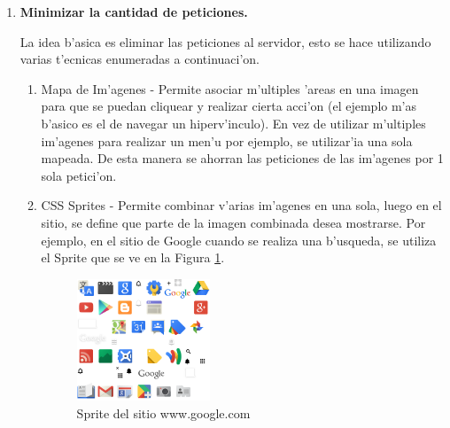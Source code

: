 \begin{enumerate}

\item \textbf{Minimizar la cantidad de peticiones.}

La idea b'asica es eliminar las peticiones al servidor, esto se hace utilizando varias t'ecnicas enumeradas a continuaci'on.

	\begin{enumerate}
	\item Mapa de Im'agenes - Permite asociar m'ultiples 'areas en una imagen para que se puedan cliquear y realizar cierta acci'on (el ejemplo m'as b'asico es el de navegar un hiperv'inculo). En vez de utilizar m'ultiples im'agenes para realizar un men'u por ejemplo, se utilizar'ia una sola mapeada. De esta manera se ahorran las peticiones de las im'agenes por 1 sola petici'on.
	\item CSS Sprites - Permite combinar v'arias im'agenes en una sola, luego en el sitio, se define que parte de la imagen combinada desea mostrarse. Por ejemplo, en el sitio de Google cuando se realiza una b'usqueda, se utiliza el Sprite que se ve en la Figura \ref{css_sprites}.
		\begin{figure}[htbp]
		\begin{center}
			\includegraphics[width=150px]{img/css_sprites}
			\caption{\small Sprite del sitio www.google.com}
		\end{center}
		\label{css_sprites}
		\end{figure}


\end{enumerate}
\end{enumerate}
